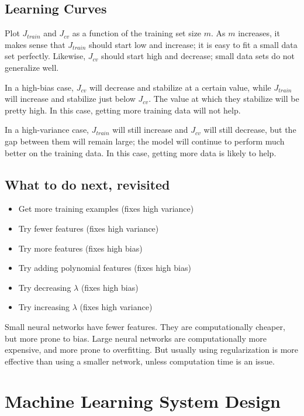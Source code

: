 \subsection{Learning Curves}

Plot $J_{train}$ and $J_{cv}$ as a function of the training set size $m$.
As $m$ increases, it makes sense that $J_{train}$ should start low and increase;
it is easy to fit a small data set perfectly.
Likewise, $J_{cv}$ should start high and decrease;
small data sets do not generalize well.

In a high-bias case, $J_{cv}$ will decrease and stabilize at a certain value,
while $J_{train}$ will increase and stabilize just below $J_{cv}$.
The value at which they stabilize will be pretty high.
In this case, getting more training data will not help.

In a high-variance case, $J_{train}$ will still increase and $J_{cv}$ will still decrease,
but the gap between them will remain large; the model will continue to perform much better on the training data.
In this case, getting more data is likely to help.

\subsection{What to do next, revisited}

\begin{itemize}
    \item Get more training examples (fixes high variance)
    \item Try fewer features (fixes high variance)
    \item Try more features (fixes high bias)
    \item Try adding polynomial features (fixes high bias)
    \item Try decreasing $\lambda$ (fixes high bias)
    \item Try increasing $\lambda$ (fixes high variance)
\end{itemize}

Small neural networks have fewer features.
They are computationally cheaper, but more prone to bias.
Large neural networks are computationally more expensive, and more prone to overfitting.
But usually using regularization is more effective than using a smaller network, 
unless computation time is an issue.

\section{Machine Learning System Design}

